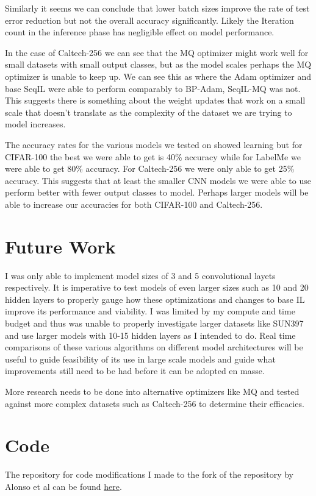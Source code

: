 \documentclass{article}
\theoremstyle{plain}
\theoremstyle{definition}
\theoremstyle{remark}
\begin{document}
Similarly it seems we can conclude that lower batch sizes improve the rate of test error reduction but not the overall
accuracy significantly. Likely the Iteration count in the inference phase has negligible effect on 
model performance. 

In the case of Caltech-256 we can see that the MQ optimizer might work well for small datasets with 
small output classes, but as the model scales perhaps the MQ optimizer is unable to keep up. We can see this 
as where the Adam optimizer and base SeqIL were able to perform comparably to
BP-Adam, SeqIL-MQ was not. This suggests there is something about the weight updates that work
on a small scale that doesn't translate as the complexity of the dataset we are trying to model increases.

The accuracy rates for the various models we tested on showed learning but for CIFAR-100 the best we were able to get is 
40\% accuracy while for LabelMe we were able to get 80\% accuracy. For Caltech-256 we were only able to get 25\% accuracy.
This suggests that at least the smaller CNN models we were able to use perform better with fewer output classes to model.
Perhaps larger models will be able to increase our accuracies for both CIFAR-100 and Caltech-256.

\section{Future Work}

I was only able to implement model sizes of 3 and 5 convolutional layets respectively. It is imperative to test models
of even larger sizes such as 10 and 20 hidden layers to properly gauge how these optimizations and changes to base IL 
improve its performance and viability. I was limited by my compute and time budget and thus was unable to properly investigate 
larger datasets like SUN397 and use larger models with 10-15 hidden layers as I intended to do. 
Real time comparisons of these various algorithms on different model architectures will be useful to guide 
feasibility of its use in large scale models and guide what improvements still need to be had before it can be 
adopted en masse. 

More research needs to be done into alternative optimizers like MQ and tested against more complex datasets such as Caltech-256
to determine their efficacies. 

\section*{Code}

The repository for code modifications I made to the fork of the repository by Alonso et al can be found \href{https://github.com/rmohnani/PredictiveCoding-MQSeqIL}{here}.

\nocite{langley00}



\end{document}
